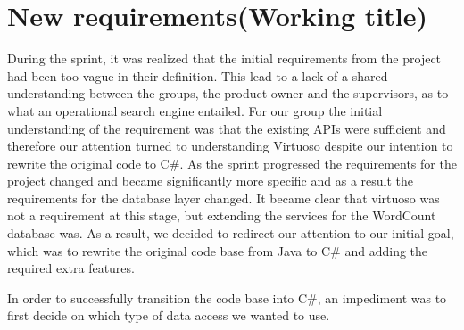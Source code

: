 \section{New requirements(Working title)} \label{ssec:newRequirements}
During the sprint, it was realized that the initial requirements from the \knox{} project had been too vague in their definition. This lead to a lack of a shared understanding between the groups, the product owner and the supervisors, as to what an operational search engine entailed. For our group the initial understanding of the requirement was that the existing APIs were sufficient and therefore our attention turned to understanding Virtuoso despite our intention to rewrite the original code to C\#. 
As the sprint progressed the requirements for the \knox{} project changed and became significantly more specific and as a result the requirements for the database layer changed. It became clear that virtuoso was not a requirement at this stage, but extending the services for the WordCount database was. As a result, we decided to redirect our attention to our initial goal, which was to rewrite the original code base from Java to C\# and adding the required extra features.

In order to successfully transition the code base into C\#, an impediment was to first decide on which type of data access we wanted to use.


